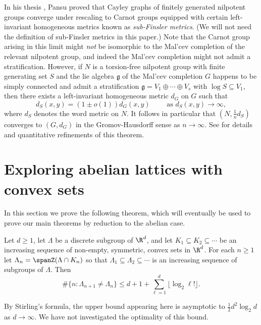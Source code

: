 In his thesis \cite{pansu1983croissance}, Pansu proved that Cayley graphs of finitely generated nilpotent groups converge under rescaling to Carnot groups equipped with certain left-invariant homogeneous metrics known as \emph{sub-Finsler metrics}. (We will not need the definition of sub-Finsler metrics in this paper.) Note that the Carnot group arising in this limit might \emph{not} be isomorphic to the Mal'cev completion of the relevant nilpotent group, and indeed the Mal'cev completion might not admit a stratification. However, if $N$ is a torsion-free nilpotent group with finite generating set $S$ and the lie algebra $\mathfrak{g}$ of the Mal'cev completion $G$ happens to be simply connected and admit a stratification $\mathfrak{g}=V_1\oplus \cdots \oplus V_s$ with $\log S \subseteq V_1$, then there exists a left-invariant homogeneous metric $d_G$ on $G$ such that
\begin{equation}
\label{eq:Pansu}
d_S(x,y)=(1\pm o(1)) d_G(x,y) \qquad \text{ as $d_S(x,y)\to \infty$},
\end{equation}
where $d_S$ denotes the word metric on $N$. It follows in particular that $(N,\frac{1}{n}d_S)$ converges to $(G,d_G)$ in the Gromov-Hausdorff sense as $n\to\infty$. See \cite{breuillard2013rate,tashiro2022speed} for details and quantitative refinements of this theorem.



\section{Exploring abelian lattices with convex sets}
\label{sec:Abelian}

In this section we prove the following theorem, which will eventually be used to prove our main theorems by reduction to the abelian case.

\begin{thm}
\label{thm:Abelian_convex}
Let $d\geq 1$, let $\Lambda$ be a discrete subgroup of $\R^d$, and let $K_1 \subseteq K_2 \subseteq \cdots$ be an increasing sequence of non-empty, symmetric, convex sets in $\R^d$. For each $n\geq 1$ let $\Lambda_n = \spanZ(\Lambda \cap K_n)$ so that $\Lambda_1 \subseteq \Lambda_2 \subseteq \cdots$ is an increasing sequence of subgroups of $\Lambda$. Then 
\[
\#\{n :\Lambda_{n+1}\neq \Lambda_n\} \leq d +1 + \sum_{\ell=1}^d \lfloor \log_2 \ell! \rfloor.
\]
\end{thm}

\begin{remark}
By Stirling's formula, the upper bound appearing here is asymptotic to $\frac{1}{2}d^2 \log_2 d$ as $d\to \infty$. We have not investigated the optimality of this bound.
\end{remark}

